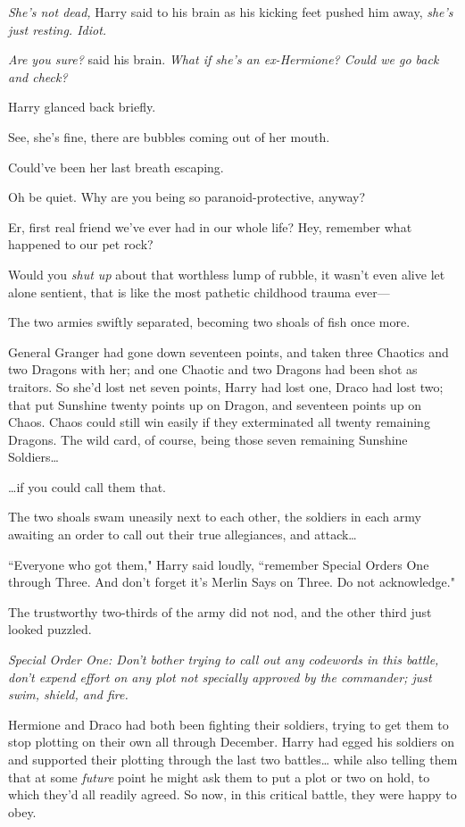 \emph{She's not dead,} Harry said to his brain as his kicking feet pushed him away, \emph{she's just resting. \emph{Idiot.}}

\emph{Are you sure?} said his brain. \emph{What if she's an ex-Hermione? Could we go back and check?}

Harry glanced back briefly.

\begin{em}
See, she's fine, there are bubbles coming out of her mouth.

Could've been her last breath escaping.

Oh be quiet. Why are you being so paranoid-protective, anyway?

Er, first real friend we've ever had in our whole life? Hey, remember what happened to our pet rock?

Would you \emph{shut up} about that worthless lump of rubble, it wasn't even alive let alone sentient, that is like the most pathetic childhood trauma ever—
\end{em}

The two armies swiftly separated, becoming two shoals of fish once more.

General Granger had gone down seventeen points, and taken three Chaotics and two Dragons with her; and one Chaotic and two Dragons had been shot as traitors. So she'd lost net seven points, Harry had lost one, Draco had lost two; that put Sunshine twenty points up on Dragon, and seventeen points up on Chaos. Chaos could still win easily if they exterminated all twenty remaining Dragons. The wild card, of course, being those seven remaining Sunshine Soldiers{\ldots}

{\ldots}if you could call them that.

The two shoals swam uneasily next to each other, the soldiers in each army awaiting an order to call out their true allegiances, and attack{\ldots}

``Everyone who got them," Harry said loudly, ``remember Special Orders One through Three. And don't forget it's Merlin Says on Three. Do not acknowledge."

The trustworthy two-thirds of the army did not nod, and the other third just looked puzzled.

\emph{Special Order One: Don't bother trying to call out any codewords in this battle, don't expend effort on any plot not specially approved by the commander; just swim, shield, and fire.}

Hermione and Draco had both been fighting their soldiers, trying to get them to stop plotting on their own all through December. Harry had egged his soldiers on and supported their plotting through the last two battles{\ldots} while also telling them that at some \emph{future} point he might ask them to put a plot or two on hold, to which they'd all readily agreed. So now, in this critical battle, they were happy to obey.

